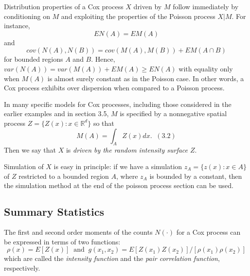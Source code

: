 \documentclass{article}
\begin{document}
Distribution properties of a Cox process $X$ driven by $M$ follow immediately by conditioning on $M$ and exploiting the properties of the Poisson process $X|M$. For instance, $$EN(A) = EM(A)$$ and $$cov(N(A),N(B)) = cov(M(A), M(B)) + EM(A\cap B)$$ for bounded regions $A$ and $B$. Hence, $var(N(A)) = var(M(A)) + EM(A) \geq EN(A)$ with equality only when $M(A)$ is almost surely constant as in the Poisson case. In other words, a Cox process exhibits over dispersion when compared to a Poisson process. 

In many specific models for Cox processes, including those considered in the earlier examples and in section 3.5, $M$ is specified by a nonnegative spatial process $Z = \{ Z(x) : x\in \mathbb{R}^d \}$ so that $$M(A) = \int_A Z(x) dx. \; \; (3.2)$$ Then we say that $X$ is {\it driven by the random intensity surface $Z$}. 

Simulation of $X$ is easy in principle: if we have a simulation $z_A = \{z(x) : x\in A\}$ of $Z$ restricted to a bounded region $A$, where $z_A$ is bounded by a constant, then the simulation method at the end of the poisson process section can be used. 

\subsection*{Summary Statistics}
The first and second order moments of the counts $N(\cdot)$ for a Cox process can be expressed in terms of two functions: $$\rho(x) = E[Z(x)] \; \; \text{and} \; \; g(x_1, x_2) = E[Z(x_1)Z(x_2)]/[\rho(x_1) \rho(x_2)]$$ which are called the {\it intensity function} and the {\it pair correlation function}, respectively.   
\end{document}
